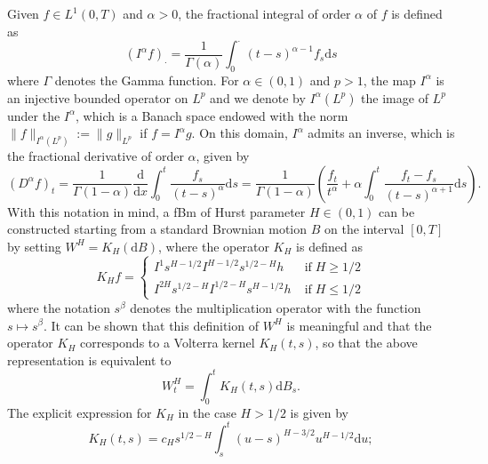 \documentclass[10pt]{article}
\newcommand{\assign}{:=}
\newcommand{\mathd}{\mathrm{d}}
\newcommand{\tmop}[1]{\ensuremath{\operatorname{#1}}}
\begin{document}
Given $f \in L^1 (0, T)$ and $\alpha > 0$, the fractional integral of order
$\alpha$ of $f$ is defined as
\begin{equation}
  (I^{\alpha} f)_{\cdot} = \frac{1}{\Gamma (\alpha)} \int_0^{\cdot} (t -
  s)^{\alpha - 1} f_s \mathd s \label{sec4.2.2 frac integral}
\end{equation}
where $\Gamma$ denotes the Gamma function. For $\alpha \in (0, 1)$ and $p >
1$, the map $I^{\alpha}$ is an injective bounded operator on $L^p$ and we
denote by $I^{\alpha} (L^p)$ the image of $L^p$ under the $I^{\alpha}$, which
is a Banach space endowed with the norm $\| f \|_{I^{\alpha} (L^p)} \assign \|
g \|_{L^p}$ if $f = I^{\alpha} g$. On this domain, $I^{\alpha}$ admits an
inverse, which is the fractional derivative of order $\alpha$, given by
\begin{equation}
  (D^{\alpha} f)_t = \frac{1}{\Gamma (1 - \alpha)}  \frac{\mathd}{\mathd x} 
  \int_0^t \frac{f_s}{(t - s)^{\alpha}} \mathd s = \frac{1}{\Gamma (1 -
  \alpha)}  \left( \frac{f_t}{t^{\alpha}} + \alpha \int_0^t \frac{f_t -
  f_s}{(t - s)^{\alpha + 1}} \mathd s \right) . \label{sec4.2.2 frac
  derivative}
\end{equation}
With this notation in mind, a fBm of Hurst parameter $H \in (0, 1)$ can be
constructed starting from a standard Brownian motion $B$ on the interval $[0,
T]$ by setting $W^H = K_H (\mathd B)$, where the operator $K_H$ is defined as
\[ K_H f = \left\{\begin{array}{ll}
     I^1 s^{H - 1 / 2} I^{H - 1 / 2} s^{1 / 2 - H} h & \tmop{if} H \geqslant 1
     / 2\\
     I^{2 H} s^{1 / 2 - H} I^{1 / 2 - H} s^{H - 1 / 2} h & \tmop{if} H
     \leqslant 1 / 2
   \end{array}\right. \]
where the notation $s^{\beta}$ denotes the multiplication operator with the
function $s \mapsto s^{\beta}$. It can be shown that this definition of $W^H$
is meaningful and that the operator $K_H$ corresponds to a Volterra kernel
$K_H (t, s)$, so that the above representation is equivalent to
\begin{equation}
  W^H_t = \int_0^t K_H (t, s) \mathd B_s . \label{sec4.2.2 canonical
  representation}
\end{equation}
The explicit expression for $K_H$ in the case $H > 1 / 2$ is given by
\begin{equation}
  K_H (t, s) = c_H s^{1 / 2 - H} \int_s^t (u - s)^{H - 3 / 2} u^{H - 1 / 2}
  \mathd u ; \label{sec4.2.2 volterra kernel}
\end{equation}
\end{document}
